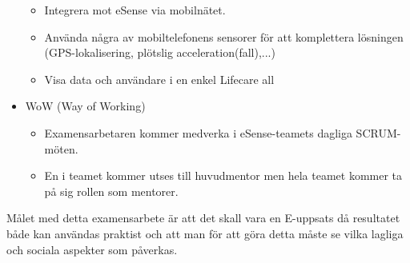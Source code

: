 \documentclass[a4paper]{article}
\begin{document}
\begin{itemize}
\begin{itemize}
		\item Integrera mot eSense via mobilnätet.
		\item Använda några av mobiltelefonens sensorer för att komplettera lösningen (GPS-lokalisering, plötslig acceleration(fall),...)
		\item Visa data och användare i en enkel Lifecare all
	\end{itemize}
	\item WoW (Way of Working)
	\begin{itemize}
		\item Examensarbetaren kommer medverka i eSense-teamets dagliga SCRUM-möten.
		\item En i teamet kommer utses till huvudmentor men hela teamet kommer ta på sig rollen som mentorer.
	\end{itemize}
\end{itemize}

Målet med detta examensarbete är att det skall vara en E-uppsats då resultatet både kan användas praktist och att man för att göra detta måste se vilka lagliga och sociala aspekter som påverkas.
\end{document}
